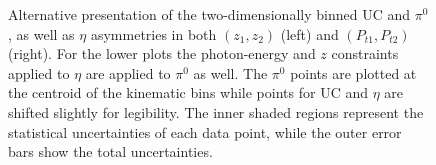 \begin{figure}[H]
  \centering     
\caption[Alternative presentation of the two-dimensionally binned UC and $\pi^0$, as well as $\eta$ asymmetries in both $(z_1,z_2)$ and $(P_{t1},P_{t2})$]{Alternative presentation of the two-dimensionally binned UC and $\pi^0$, as well as $\eta$ asymmetries in both $(z_1,z_2)$ (left) and $(P_{t1},P_{t2})$ (right). 
For the lower plots the photon-energy and $z$ constraints applied to $\eta$ are applied to $\pi^0$ as well.
The $\pi^0$ points are plotted at the centroid of the kinematic bins while points for UC and $\eta$ are shifted slightly for legibility. 
The inner shaded regions represent the statistical uncertainties of each data point, while the outer error bars show the total uncertainties.}
\label{fig:finalasymmetry4}
\end{figure}

